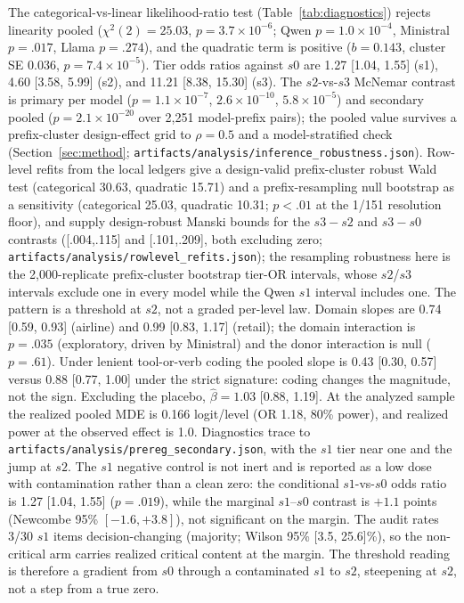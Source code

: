 \documentclass[a4paper,fleqn]{cas-sc}
\begin{document}
The categorical-vs-linear likelihood-ratio test (Table~\ref{tab:diagnostics}) rejects linearity pooled
($\chi^2(2) = 25.03$, $p = 3.7\times10^{-6}$; Qwen $p = 1.0\times10^{-4}$, Ministral $p=.017$,
Llama $p=.274$), and the quadratic term is positive ($b = 0.143$, cluster SE $0.036$,
$p = 7.4\times10^{-5}$). Tier odds ratios against $s0$ are 1.27 [1.04, 1.55] (s1), 4.60
[3.58, 5.99] (s2), and 11.21 [8.38, 15.30] (s3). The $s2$-vs-$s3$ McNemar contrast is
primary per model ($p=1.1\times10^{-7}$, $2.6\times10^{-10}$,
$5.8\times10^{-5}$) and secondary pooled ($p = 2.1\times10^{-20}$ over 2{,}251
model-prefix pairs); the pooled value survives a prefix-cluster design-effect grid to
$\rho=0.5$ and a model-stratified check (Section~\ref{sec:method};
\texttt{artifacts/analysis/inference\_robustness.json}). Row-level refits from the local ledgers
give a design-valid prefix-cluster robust Wald test (categorical 30.63, quadratic 15.71) and a
prefix-resampling null bootstrap as a sensitivity (categorical 25.03, quadratic 10.31; $p<.01$ at
the 1/151 resolution floor), and supply design-robust Manski bounds for the $s3-s2$ and $s3-s0$
contrasts ([.004,.115] and [.101,.209], both excluding zero;
\texttt{artifacts/analysis/rowlevel\_refits.json}); the resampling
robustness here is the 2{,}000-replicate prefix-cluster bootstrap tier-OR intervals, whose
$s2$/$s3$ intervals exclude one in every model while the Qwen $s1$ interval includes one. The pattern is a threshold at $s2$, not a graded per-level law. Domain
slopes are 0.74 [0.59, 0.93] (airline) and 0.99 [0.83, 1.17] (retail); the domain interaction is
$p=.035$ (exploratory, driven by Ministral) and the donor interaction is null ($p=.61$). Under
lenient tool-or-verb coding the pooled slope is 0.43 [0.30, 0.57] versus 0.88 [0.77, 1.00] under
the strict signature: coding changes the magnitude, not the sign. Excluding the placebo,
$\hat\beta = 1.03$ [0.88, 1.19]. At the analyzed sample the realized pooled MDE is 0.166
logit/level (OR 1.18, 80\% power), and realized power at the observed effect is 1.0.
Diagnostics trace to \texttt{artifacts/analysis/prereg\_secondary.json}, with the $s1$ tier
near one and the jump at $s2$.
The $s1$ negative control is not inert and is reported as a low dose with contamination
rather than a clean zero: the conditional $s1$-vs-$s0$ odds ratio is 1.27 [1.04, 1.55]
($p=.019$), while the marginal $s1$--$s0$ contrast is $+1.1$ points (Newcombe 95\%
$[-1.6, +3.8]$), not significant on the margin. The audit rates 3/30 $s1$ items
decision-changing (majority; Wilson 95\% [3.5, 25.6]\%), so the non-critical arm carries
realized critical content at the margin. The threshold reading is therefore a gradient from
$s0$ through a contaminated $s1$ to $s2$, steepening at $s2$, not a step from a true zero.
\end{document}
